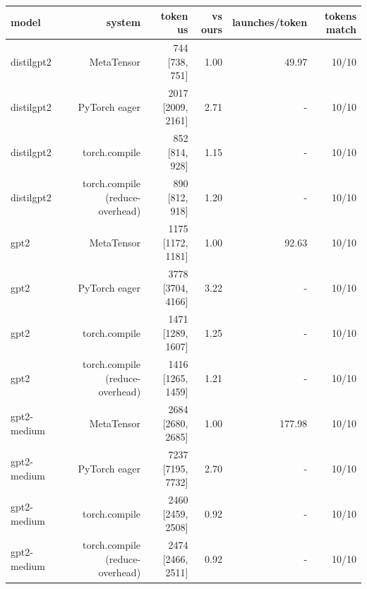 \begin{tabular}{lrrrrr}
\toprule
model & system & token us & vs ours & launches/token & tokens match \\
\midrule
distilgpt2 & MetaTensor & 744 [738, 751] & 1.00 & 49.97 & 10/10 \\
distilgpt2 & PyTorch eager & 2017 [2009, 2161] & 2.71 & - & 10/10 \\
distilgpt2 & torch.compile & 852 [814, 928] & 1.15 & - & 10/10 \\
distilgpt2 & torch.compile (reduce-overhead) & 890 [812, 918] & 1.20 & - & 10/10 \\
gpt2 & MetaTensor & 1175 [1172, 1181] & 1.00 & 92.63 & 10/10 \\
gpt2 & PyTorch eager & 3778 [3704, 4166] & 3.22 & - & 10/10 \\
gpt2 & torch.compile & 1471 [1289, 1607] & 1.25 & - & 10/10 \\
gpt2 & torch.compile (reduce-overhead) & 1416 [1265, 1459] & 1.21 & - & 10/10 \\
gpt2-medium & MetaTensor & 2684 [2680, 2685] & 1.00 & 177.98 & 10/10 \\
gpt2-medium & PyTorch eager & 7237 [7195, 7732] & 2.70 & - & 10/10 \\
gpt2-medium & torch.compile & 2460 [2459, 2508] & 0.92 & - & 10/10 \\
gpt2-medium & torch.compile (reduce-overhead) & 2474 [2466, 2511] & 0.92 & - & 10/10 \\
\bottomrule
\end{tabular}
